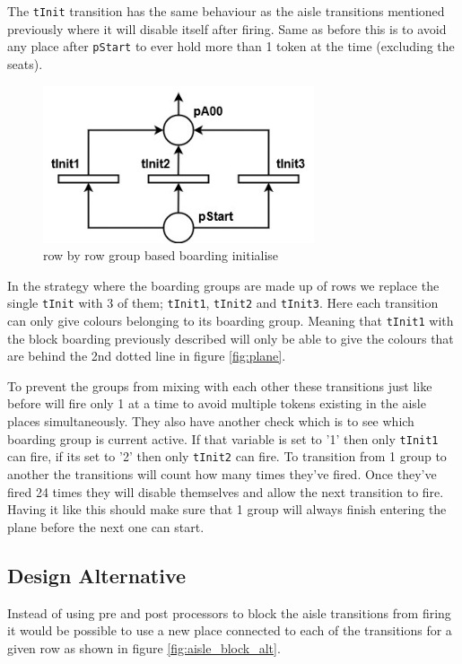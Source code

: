 \documentclass[english]{article}
\begin{document}
The \lstinline{tInit} transition has the same behaviour as the aisle transitions mentioned previously where it will disable itself after firing. Same as before this is to avoid any place after \lstinline{pStart} to ever hold more than 1 token at the time (excluding the seats).

\begin{figure}[H]
    \centering
    \includegraphics[width=8cm]{figures/group_init.jpg}
    \caption{row by row group based boarding initialise}
    \label{fig:group_init}
\end{figure}

In the strategy where the boarding groups are made up of rows we replace the single \lstinline{tInit} with 3 of them; \lstinline{tInit1}, \lstinline{tInit2} and \lstinline{tInit3}. Here each transition can only give colours belonging to its boarding group. Meaning that \lstinline{tInit1} with the block boarding previously described will only be able to give the colours that are behind the 2nd dotted line in figure \ref{fig:plane}. 

To prevent the groups from mixing with each other these transitions just like before will fire only 1 at a time to avoid multiple tokens existing in the aisle places simultaneously. They also have another check which is to see which boarding group is current active. If that variable is set to '1' then only \lstinline{tInit1} can fire, if its set to '2' then only \lstinline{tInit2} can fire. To transition from 1 group to another the transitions will count how many times they've fired. Once they've fired 24 times they will disable themselves and allow the next transition to fire. Having it like this should make sure that 1 group will always finish entering the plane before the next one can start.


\subsection{Design Alternative}
Instead of using pre and post processors to block the aisle transitions from firing it would be possible to use a new place connected to each of the transitions for a given row as shown in figure \ref{fig:aisle_block_alt}.
\end{document}
